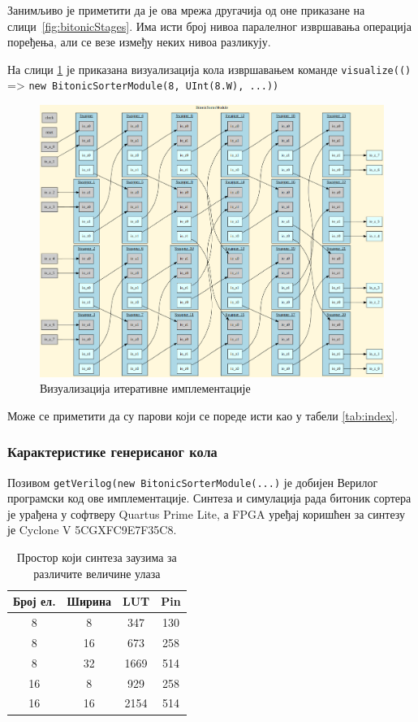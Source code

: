 \documentclass[12pt, a4paper]{article}
\theoremstyle{definition}
\begin{document}
Занимљиво је приметити да је ова мрежа другачија од оне приказане на \mbox{слици \ref{fig:bitonicStages}}. Има исти број нивоа паралелног извршавања операција поређења, али се везе између неких нивоа разликују.

\newpage
На слици \ref{fig:visualizeIter} је приказана визуализација кола извршавањем команде \verb+visualize(()+ => \verb+new BitonicSorterModule(8, UInt(8.W), ...))+

\begin{figure}[H]
  \centering
      \includegraphics[scale=0.3]{slike/visualizeIter}
  \caption{Визуализација итеративне имплементације}
  \label{fig:visualizeIter}
\end{figure}

Може се приметити да су парови који се пореде исти као у табели \ref{tab:index}.

\subsubsection{Карактеристике генерисаног кола}
Позивом \verb+getVerilog(new BitonicSorterModule(...)+ је добијен Верилог програмски код ове имплементације. Синтеза и симулација рада битоник сортера је урађена у софтверу Quartus Prime Lite, а FPGA уређај коришћен за синтезу је Cyclone V 5CGXFC9E7F35C8.

\begin{table}[H]
\centering
 \begin{tabular}{| c | c | c c |}
  \hline
  Број ел. & Ширина & LUT & Pin \\
  \hline
  8 & 8  & 347 & 130 \\
  8 & 16 & 673 & 258 \\
  8 & 32 & 1669 & 514 \\
  \hline
  16 & 8 & 929 & 258 \\
  16 & 16 & 2154 & 514 \\
  \hline
 \end{tabular}
 \caption{Простор који синтеза заузима за различите величине улаза}
 \label{tab:cipSintezaIter}
\end{table}
\end{document}
